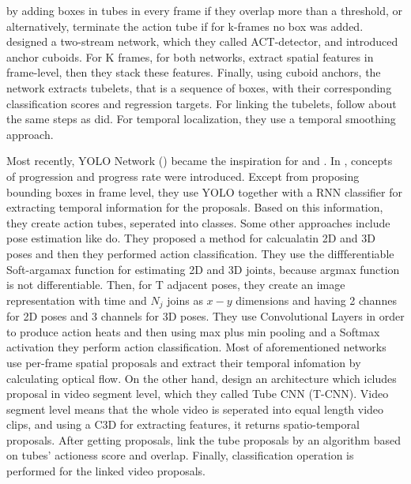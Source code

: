 \documentclass{report}
\begin{document}
by adding boxes in tubes in every frame if they overlap more than a threshold, or alternatively, terminate the action tube if for k-frames no box was added.  \cite{kalogeiton17iccv:hal-01519812}
designed a two-stream network, which they called ACT-detector, and introduced anchor cuboids. For K frames, for both networks, \cite{kalogeiton17iccv:hal-01519812} extract spatial
features in frame-level, then they stack these features. Finally, using cuboid anchors, the network extracts tubelets, that is a sequence of boxes, with their corresponding classification
scores and regression targets. For linking the tubelets, \cite{kalogeiton17iccv:hal-01519812} follow about the same steps as \cite{singh2016online} did. For temporal localization, they use
a temporal smoothing approach. \par

Most recently, YOLO Network (\cite{DBLP:journals/corr/RedmonDGF15}) became the inspiration for \cite{DBLP:journals/corr/abs-1903-00304} and
\cite{DBLP:journals/corr/abs-1802-08362}. In \cite{DBLP:journals/corr/abs-1903-00304}, concepts of progression and progress
rate were introduced. Except from proposing bounding boxes in frame level, they use YOLO together with a RNN classifier for extracting temporal information for the proposals.
Based on this information, they create action tubes, seperated into classes. Some other approaches include pose estimation like \cite{DBLP:journals/corr/abs-1802-09232} do.%
They proposed a method for calcualatin 2D and 3D poses and then they performed action classification. They use the diffferentiable Soft-argamax function for estimating 2D and 3D joints, because
argmax function is not differentiable. Then, for T adjacent poses, they create an image representation with time and $N_j$ joins as $x-y$ dimensions and having 2 channes for 2D poses and 3
channels for 3D poses. They use Convolutional Layers in order to produce action heats and then using max plus min pooling and a Softmax activation they perform action classification.
Most of aforementioned networks use per-frame spatial proposals and extract their temporal infomation by calculating optical flow. On the other hand, \cite{DBLP:journals/corr/HouCS17} design
an architecture which icludes proposal in video segment level, which they called Tube CNN (T-CNN). Video segment level means that the whole video is seperated into equal length video clips, and
using a C3D for extracting features, it returns spatio-temporal proposals. After getting proposals, \cite{DBLP:journals/corr/HouCS17} link the tube proposals by an algorithm based on tubes'
actioness score and overlap. Finally, classification operation is performed for the linked video proposals.
\printbibliography
\end{document}
